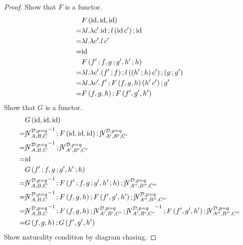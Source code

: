 \documentclass[runningheads,envcountsame]{llncs}
\begin{document}
\begin{proof}
    Show that $F$ is a functor.
    \begin{align}
         & F\,(\id, \id, \id) \\
        =& \lambda l. \lambda c'. \comp{\id}{\comp{l\,(\id\,c')}{\id}} \\
        =& \lambda l. \lambda c'. l\,c' \\
        =& \id \\
         & F\,(\comp{f'}{f}, \comp{g}{g'}, \comp{h'}{h}) \\
        =& \lambda l. \lambda c'. \comp{(\comp{f'}{f})}{\comp{l\,((\comp{h'}{h})\,c')}{(\comp{g}{g'})}} \\
        =& \lambda l. \lambda c'. \comp{f'}{\comp{F\,(f, g, h)\,(h'\,c')}{g'}} \\
        =& \comp{F\,(f, g, h)}{F\,(f', g', h')}
    \end{align}
    Show that $G$ is a functor.
    \begin{align}
         & G\,(\id, \id, \id) \\
        =& \comp{{\juncurry[\D, p=q]_{A, B, C}}^{-1}}{\comp{F\,(\id, \id, \id)}{\juncurry[\D, p=q]_{A', B', C'}}} \\
        =& \comp{{\juncurry[\D, p=q]_{A, B, C}}^{-1}}{\juncurry[\D, p=q]_{A', B', C'}} \\
        =& \id \\
         & G\,(\comp{f'}{f}, \comp{g}{g'}, \comp{h'}{h}) \\
        =& \comp{{\juncurry[\D, p=q]_{A, B, C}}^{-1}}{\comp{F\,(\comp{f'}{f}, \comp{g}{g'}, \comp{h'}{h})}{\juncurry[\D, p=q]_{A'', B'', C''}}} \\
        =& \comp{{\juncurry[\D, p=q]_{A, B, C}}^{-1}}{\comp{\comp{F\,(f, g, h)}{F\,(f', g', h')}}{\juncurry[\D, p=q]_{A'', B'', C''}}} \\
        =& \comp{{\juncurry[\D, p=q]_{A, B, C}}^{-1}}{\comp{\comp{\comp{F\,(f, g, h)}{\comp{{\juncurry[\D, p=q]_{A', B', C'}}}{{\juncurry[\D, p=q]_{A', B', C'}}^{-1}}}}{F\,(f', g', h')}}{\juncurry[\D, p=q]_{A'', B'', C''}}} \\
        =& \comp{G\,(f, g, h)}{G\,(f', g', h')}
    \end{align}
    Show naturality condition by diagram chasing.
    
\end{proof}
\end{document}
